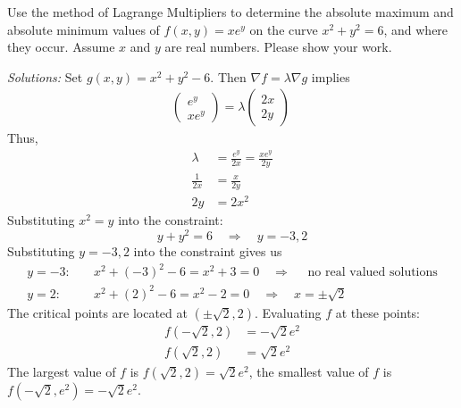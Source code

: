    \fi
    
\fi


\ifnum {}
\question[6] Use the method of Lagrange Multipliers to determine the absolute maximum and absolute minimum values of $f(x,y) = xe^y$ on the curve $x^2+y^2=6$, and where they occur. Assume $x$ and $y$ are real numbers. Please show your work. 

\ifnum {} {\color{DarkBlue} \textit{Solutions:} Set $g(x,y) = x^2 +y^2 - 6$. Then $\nabla f = \lambda \nabla g$ implies
\begin{align}
    \begin{pmatrix} e^y\\xe^y\end{pmatrix} = \lambda \begin{pmatrix} 2x\\2y\end{pmatrix} \
\end{align}
Thus,
\begin{align}
    \lambda &= \frac{e^y}{2x} = \frac{xe^y}{2y} \\
    \frac{1}{2x} &= \frac{x}{2y} \\
    2y &= 2x^2
\end{align}
Substituting $x^2 =y$ into the constraint: 
$$ y+y^2 = 6 \quad \Rightarrow \quad y = -3, 2 $$
Substituting $y = -3, 2$ into the constraint gives us 
\begin{align}
    y = -3: & \quad x^2 +(-3)^2 - 6 = x^2 +3 = 0\quad \Rightarrow \quad \text{ no real valued solutions} \\
    y = 2: & \quad x^2 +(2)^2 - 6 = x^2 -2   = 0 \quad \Rightarrow \quad x = \pm \sqrt 2 
\end{align}
The critical points are located at $(\pm\sqrt2,2)$. Evaluating $f$ at these points:
\begin{align}
    f(-\sqrt2,2) &= -\sqrt2e^2 \\
    f(\sqrt2,2) &= \sqrt2e^2 
\end{align}
The largest value of $f$ is $f(\sqrt2,2) = \sqrt 2 e^2$, the smallest value of $f$ is $f(-\sqrt2,e^2) = -\sqrt 2 e^2$. 
} 
\else
\fi        
\fi





